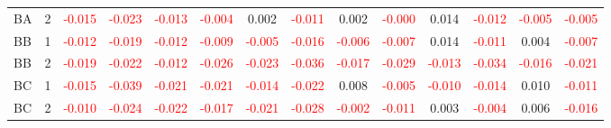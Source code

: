 \begin{table}[!htb]
{\begin{tabular}{llcccccccccccc}
BA & 2 & \textcolor{red}{-0.015} & \textcolor{red}{-0.023} & \textcolor{red}{-0.013} & \textcolor{red}{-0.004} & 0.002 & \textcolor{red}{-0.011} & 0.002 & \textcolor{red}{-0.000} & 0.014 & \textcolor{red}{-0.012} & \textcolor{red}{-0.005} & \textcolor{red}{-0.005}\\
BB & 1 & \textcolor{red}{-0.012} & \textcolor{red}{-0.019} & \textcolor{red}{-0.012} & \textcolor{red}{-0.009} & \textcolor{red}{-0.005} & \textcolor{red}{-0.016} & \textcolor{red}{-0.006} & \textcolor{red}{-0.007} & 0.014 & \textcolor{red}{-0.011} & 0.004 & \textcolor{red}{-0.007}\\
BB & 2 & \textcolor{red}{-0.019} & \textcolor{red}{-0.022} & \textcolor{red}{-0.012} & \textcolor{red}{-0.026} & \textcolor{red}{-0.023} & \textcolor{red}{-0.036} & \textcolor{red}{-0.017} & \textcolor{red}{-0.029} & \textcolor{red}{-0.013} & \textcolor{red}{-0.034} & \textcolor{red}{-0.016} & \textcolor{red}{-0.021}\\
BC & 1 & \textcolor{red}{-0.015} & \textcolor{red}{-0.039} & \textcolor{red}{-0.021} & \textcolor{red}{-0.021} & \textcolor{red}{-0.014} & \textcolor{red}{-0.022} & 0.008 & \textcolor{red}{-0.005} & \textcolor{red}{-0.010} & \textcolor{red}{-0.014} & 0.010 & \textcolor{red}{-0.011}\\
BC & 2 & \textcolor{red}{-0.010} & \textcolor{red}{-0.024} & \textcolor{red}{-0.022} & \textcolor{red}{-0.017} & \textcolor{red}{-0.021} & \textcolor{red}{-0.028} & \textcolor{red}{-0.002} & \textcolor{red}{-0.011} & 0.003 & \textcolor{red}{-0.004} & 0.006 & \textcolor{red}{-0.016}\\
\hline
    \end{tabular}%
    }
\end{table}

